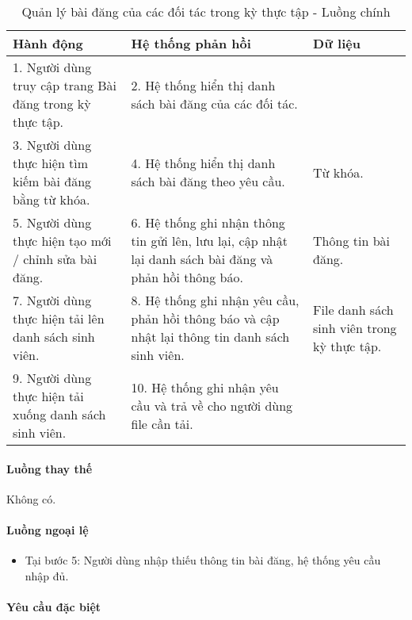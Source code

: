 \documentclass[./../main.tex]{subfiles}
\begin{document}
\begin{table}[H]
  \caption{Quản lý bài đăng của các đối tác trong kỳ thực tập - Luồng chính}
  \label{tab:orgAdmin_manage_internship_posts}
  \begin{tabularx}{\textwidth}{|X|X|X|}
    \hline
\textbf{Hành động} & \textbf{Hệ thống phản hồi} & \textbf{Dữ liệu} \\ \hline
1. Người dùng truy cập trang Bài đăng trong kỳ thực tập. & 2. Hệ thống hiển thị danh sách bài đăng của các đối tác. &  \\ \hline
3. Người dùng thực hiện tìm kiếm bài đăng bằng từ khóa. & 4. Hệ thống hiển thị danh sách bài đăng theo yêu cầu. & Từ khóa. \\ \hline
5. Người dùng thực hiện tạo mới / chỉnh sửa bài đăng. & 6. Hệ thống ghi nhận thông tin gửi lên, lưu lại, cập nhật lại danh sách bài đăng và phản hồi thông báo. & Thông tin bài đăng. \\ \hline
7. Người dùng thực hiện tải lên danh sách sinh viên. & 8. Hệ thống ghi nhận yêu cầu, phản hồi thông báo và cập nhật lại thông tin danh sách sinh viên. & File danh sách sinh viên trong kỳ thực tập. \\ \hline
9. Người dùng thực hiện tải xuống danh sách sinh viên. & 10. Hệ thống ghi nhận yêu cầu và trả về cho người dùng file cần tải. &  \\ \hline
  \end{tabularx}
\end{table}

\paragraph*{Luồng thay thế} Không có.

\paragraph*{Luồng ngoại lệ}

\begin{itemize}
  \item
    
  Tại bước 5: Người dùng nhập thiếu thông tin bài đăng, hệ thống yêu cầu nhập đủ.
  
\end{itemize}

\paragraph*{Yêu cầu đặc biệt}
\end{document}
